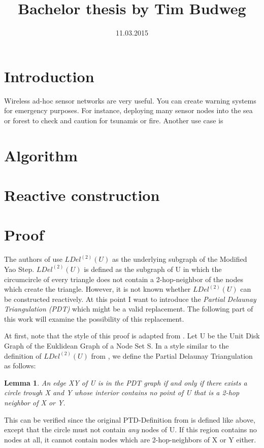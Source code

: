 \documentclass[a4paper,twoside, onecolumn]{IEEEtran}
\title{Bachelor thesis by Tim Budweg}
\author{}
\date{11.03.2015}
\newtheorem{emptycircle}{Lemma}[section]
\begin{document}
\maketitle

\section{Introduction}
Wireless ad-hoc sensor networks are very useful. 
You can create warning systems for emergency purposes.
For instance, deploying many sensor nodes into the sea or forest to check and caution for tsunamis or fire.
Another use case is
\section{Algorithm}
\section{Reactive construction}
\section{Proof}
The authors of \cite{kanj} use $LDel^{(2)}(U) $ as the underlying subgraph of the Modified Yao Step.
$LDel^{(2)}(U) $ is defined as the subgraph of U in which the circumcircle of every triangle does not contain a 2-hop-neighbor of the nodes which create the triangle.
However, it is not known whether $LDel^{(2)}(U) $ can be constructed reactively.
At this point I want to introduce the \emph{Partial Delaunay Triangulation (PDT)} \cite{pdt} which might be a valid replacement.
The following part of this work will examine the possibility of this replacement.

At first, note that the style of this proof is adapted from \cite{kanj}.
Let U be the Unit Disk Graph of the Euklidean Graph of a Node Set S.
In a style similar to the definition of $LDel^{(2)}(U) $ from \cite{kanj}, we define the Partial Delaunay Triangulation as follows:
\begin{emptycircle}
\label{emptycircle}
An edge XY of U is in the PDT graph if and only if there exists a circle trough X and Y whose interior contains no point of U that is a 2-hop neighbor of X or Y.
\end{emptycircle}
This can be verified since the original PTD-Definition from \cite{pdt} is defined like above, except that the circle must not contain \emph{any} nodes of U. 
If this region contains no nodes at all, it cannot contain nodes which are 2-hop-neighbors of X or Y either.  
\end{document}
